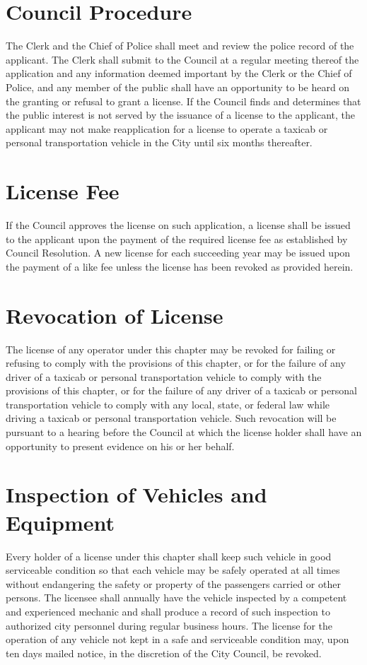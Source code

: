 \section{Council Procedure}
The Clerk and the Chief of Police shall meet and review the police record of the applicant.  The Clerk shall submit to the Council at a regular meeting thereof the application and any information deemed important by the Clerk or the Chief of Police, and any member of the public shall have an opportunity to be heard on the granting or refusal to grant a license.  If the Council finds and determines that the public interest is not served by the issuance of a license to the applicant, the applicant may not make reapplication for a license to operate a taxicab or personal transportation vehicle in the City until six months thereafter.

\section{License Fee}
If the Council approves the license on such application, a license shall be issued to the applicant upon the payment of the required license fee as established by Council Resolution.  A new license for each succeeding year may be issued upon the payment of a like fee unless the license has been revoked as provided herein.

\section{Revocation of License}
The license of any operator under this chapter may be revoked for failing or refusing to comply with the provisions of this chapter, or for the failure of any driver of a taxicab or personal transportation vehicle to comply with the provisions of this chapter, or for the failure of any driver of a taxicab or personal transportation vehicle to comply with any local, state, or federal law while driving a taxicab or personal transportation vehicle.  Such revocation will be pursuant to a hearing before the Council at which the license holder shall have an opportunity to present evidence on his or her behalf.

\section{Inspection of Vehicles and Equipment}
Every holder of a license under this chapter shall keep such vehicle in good serviceable condition so that each vehicle may be safely operated at all times without endangering the safety or property of the passengers carried or other persons.  The licensee shall annually have the vehicle inspected by a competent and experienced mechanic and shall produce a record of such inspection to authorized city personnel during regular business hours.  The license for the operation of any vehicle not kept in a safe and serviceable condition may, upon ten days mailed notice, in the discretion of the City Council, be revoked.

